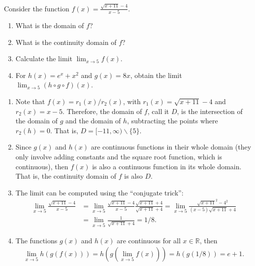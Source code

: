 \documentclass[11pt]{exam}
\newcommand{\R}{\mathbb{R}} %
\begin{document}
\begin{questions}

\question[3]
    Consider the function $f(x) = \frac{\sqrt{x + 11} - 4}{x - 5}$.
    \begin{enumerate}[leftmargin = 0.5cm, label = (\alph*), rightmargin = 0.2cm]
        \item What is the domain of $f$?
        \item What is the continuity domain of $f$?
        \item Calculate the limit $\lim_{x\rightarrow 5} f(x)$.
        \item For $h(x) = e^{x} + x^2$ and $g(x) = 8x$, obtain the limit $\lim_{x\rightarrow 5} (h\circ g \circ f)(x)$.
    \end{enumerate}
\begin{solution}[0cm]
    \begin{enumerate}[leftmargin = 0.5cm, label = (\alph*), rightmargin = 0.2cm]
        
        \item Note that $f(x) = r_1(x)/r_2(x)$, with $r_1(x) = \sqrt{x + 11} - 4$ and $r_2(x) = x - 5$. Therefore, the domain of $f$, call it $D$, is the intersection of the domain of $g$ and the domain of $h$, subtracting the points where $r_2(h) = 0$. That is, $D = [-11, \infty)\backslash\{5\}$.
        
        \item Since $g(x)$ and $h(x)$ are continuous functions in their whole domain (they only involve adding constants and the square root function, which is continuous), then $f(x)$ is also a continuous function in its whole domain. That is, the continuity domain of $f$ is also $D$.
        
        \item The limit can be computed using the ``conjugate trick'':
        \begin{align*}
            \lim_{x\rightarrow 5} \frac{\sqrt{x + 11} - 4}{x - 5} 
            &= \lim_{x\rightarrow 5} \frac{\sqrt{x + 11} - 4}{x - 5}\frac{\sqrt{x + 11} + 4}{\sqrt{x + 11} + 4} 
            = \lim_{x\rightarrow 5} \frac{\sqrt{x + 11}^2 - 4^2}{(x - 5)\sqrt{x + 11} + 4} \\
            &= \lim_{x\rightarrow 5} \frac{1}{\sqrt{x + 11} + 4} 
            = 1/8.
        \end{align*}
        
        \item The functions $g(x)$ and $h(x)$ are continuous for all $x\in\R$, then
        \begin{align*}
            \lim_{x\rightarrow 5} h(g(f(x))) = h(g(\lim_{x\rightarrow 5} f(x))) = h(g(1/8)) = e + 1.
        \end{align*}
        

\end{enumerate}
\end{solution}
\end{questions}
\end{document}
